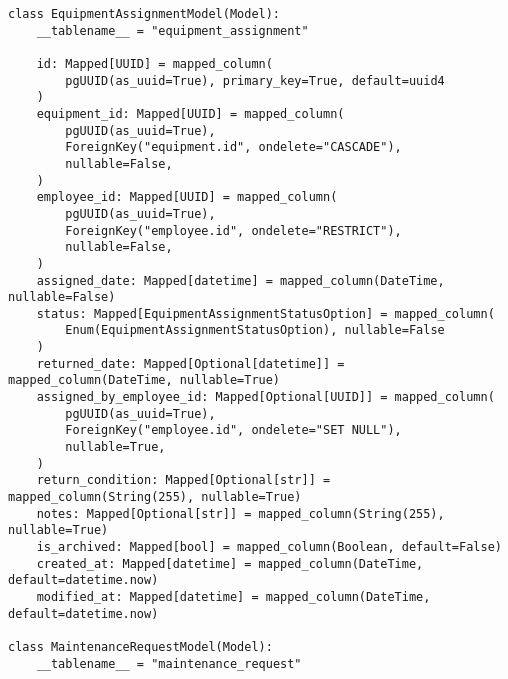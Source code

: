 \begin{lstlisting}[style=pythonstyle]
class EquipmentAssignmentModel(Model):
    __tablename__ = "equipment_assignment"

    id: Mapped[UUID] = mapped_column(
        pgUUID(as_uuid=True), primary_key=True, default=uuid4
    )
    equipment_id: Mapped[UUID] = mapped_column(
        pgUUID(as_uuid=True),
        ForeignKey("equipment.id", ondelete="CASCADE"),
        nullable=False,
    )
    employee_id: Mapped[UUID] = mapped_column(
        pgUUID(as_uuid=True),
        ForeignKey("employee.id", ondelete="RESTRICT"),
        nullable=False,
    )
    assigned_date: Mapped[datetime] = mapped_column(DateTime, nullable=False)
    status: Mapped[EquipmentAssignmentStatusOption] = mapped_column(
        Enum(EquipmentAssignmentStatusOption), nullable=False
    )
    returned_date: Mapped[Optional[datetime]] = mapped_column(DateTime, nullable=True)
    assigned_by_employee_id: Mapped[Optional[UUID]] = mapped_column(
        pgUUID(as_uuid=True),
        ForeignKey("employee.id", ondelete="SET NULL"),
        nullable=True,
    )
    return_condition: Mapped[Optional[str]] = mapped_column(String(255), nullable=True)
    notes: Mapped[Optional[str]] = mapped_column(String(255), nullable=True)
    is_archived: Mapped[bool] = mapped_column(Boolean, default=False)
    created_at: Mapped[datetime] = mapped_column(DateTime, default=datetime.now)
    modified_at: Mapped[datetime] = mapped_column(DateTime, default=datetime.now)

class MaintenanceRequestModel(Model):
    __tablename__ = "maintenance_request"


\end{lstlisting}
